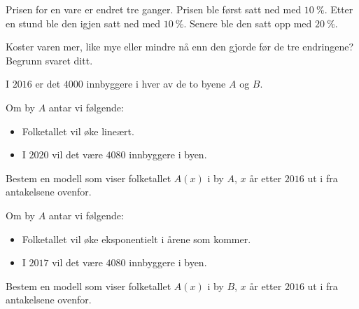\Oppgave[1] 

Prisen for en vare er endret tre ganger. Prisen ble først satt ned med
$\SI{10}{\percent}$. Etter en stund ble den igjen satt ned med
$\SI{10}{\percent}$. Senere ble den satt opp med $\SI{20}{\percent}$. \bigskip

Koster varen mer, like mye eller mindre nå enn den gjorde før de tre endringene?
Begrunn svaret ditt.


\Oppgave[3]

I $2016$ er det $\num{4000}$ innbyggere i hver av de to byene $A$ og $B$.
\bigskip

Om by $A$ antar vi følgende:
%
\begin{itemize}
  \item Folketallet vil øke lineært.
  \item I $2020$ vil det være $\num{4080}$ innbyggere i byen.
\end{itemize}

\begin{oppgaver}
   Bestem en modell som viser folketallet $A(x)$ i by $A$, $x$ år
    etter $2016$ ut i fra antakelsene ovenfor.
\end{oppgaver}

Om by $A$ antar vi følgende:
%
\begin{itemize}
  \item Folketallet vil øke eksponentielt i årene som kommer.
    \item I $2017$ vil det være $\num{4080}$ innbyggere i byen.
\end{itemize}

\begin{oppgaver}
   Bestem en modell som viser folketallet $A(x)$ i by $B$, $x$ år
    etter $2016$ ut i fra antakelsene ovenfor.
\end{oppgaver}
